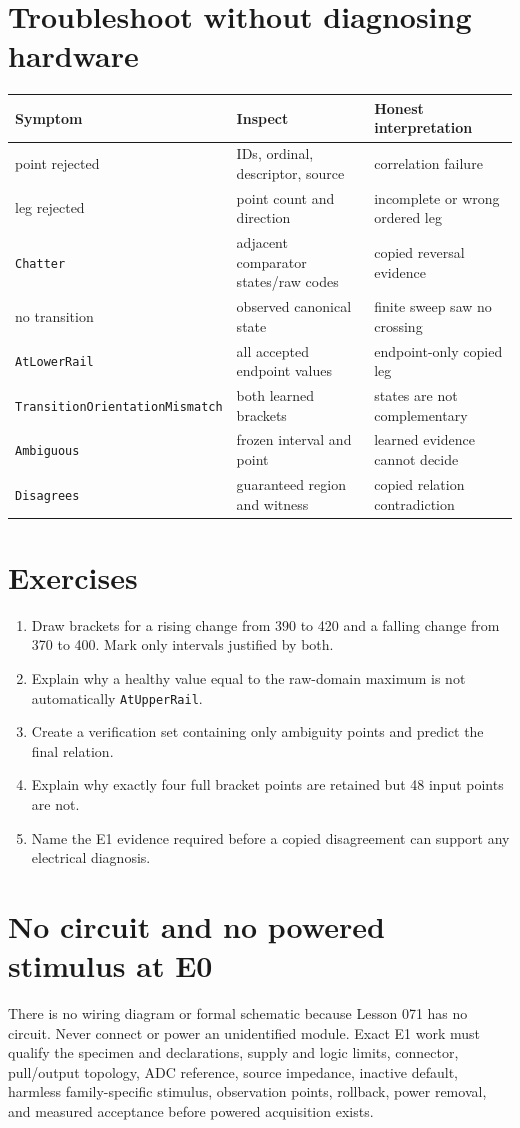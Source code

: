 \documentclass[10pt]{article}
\begin{document}
\section{Troubleshoot without diagnosing hardware}
\begin{tabularx}{\linewidth}{@{}l X X@{}}
\toprule
Symptom & Inspect & Honest interpretation\\
\midrule
point rejected & IDs, ordinal, descriptor, source & correlation failure\\
leg rejected & point count and direction & incomplete or wrong ordered leg\\
\texttt{Chatter} & adjacent comparator states/raw codes & copied reversal evidence\\
no transition & observed canonical state & finite sweep saw no crossing\\
\texttt{AtLowerRail} & all accepted endpoint values & endpoint-only copied leg\\
\texttt{TransitionOrientationMismatch} & both learned brackets & states are not complementary\\
\texttt{Ambiguous} & frozen interval and point & learned evidence cannot decide\\
\texttt{Disagrees} & guaranteed region and witness & copied relation contradiction\\
\bottomrule
\end{tabularx}

\section{Exercises}
\begin{enumerate}
 \item Draw brackets for a rising change from 390 to 420 and a falling change
       from 370 to 400. Mark only intervals justified by both.
 \item Explain why a healthy value equal to the raw-domain maximum is not
       automatically \texttt{AtUpperRail}.
 \item Create a verification set containing only ambiguity points and predict
       the final relation.
 \item Explain why exactly four full bracket points are retained but 48 input
       points are not.
 \item Name the E1 evidence required before a copied disagreement can support
       any electrical diagnosis.
\end{enumerate}

\section{No circuit and no powered stimulus at E0}
There is no wiring diagram or formal schematic because Lesson 071 has no
circuit. Never connect or power an unidentified module. Exact E1 work must
qualify the specimen and declarations, supply and logic limits, connector,
pull/output topology, ADC reference, source impedance, inactive default,
harmless family-specific stimulus, observation points, rollback, power
removal, and measured acceptance before powered acquisition exists.
\end{document}
